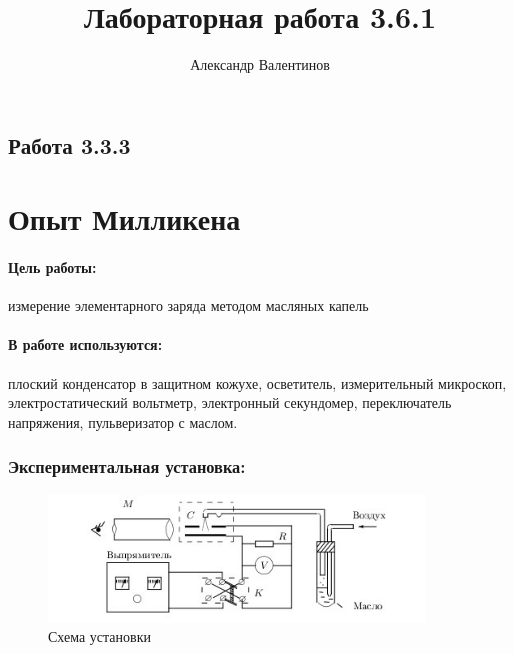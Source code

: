 \documentclass{article}
\author{Александр Валентинов}
\title{Лабораторная работа 3.6.1}
\begin{document}
   \subsection*{Работа 3.3.3}
   \section*{Опыт Милликена}
   
   \paragraph{Цель работы:} измерение элементарного заряда методом масляных капель

   \paragraph{В работе используются:} плоский конденсатор в защитном кожухе, осветитель, измерительный микроскоп, электростатический вольтметр, электронный секундомер, переключатель напряжения, пульверизатор с маслом.
   
   \subsubsection*{Экспериментальная установка:}
   
   \begin{figure}[h]
   \centering
   \includegraphics[width=10cm]{fig1.jpg} 
   \caption{Схема установки} 
   \label{fig.1} 
   \end{figure}
\end{document}
